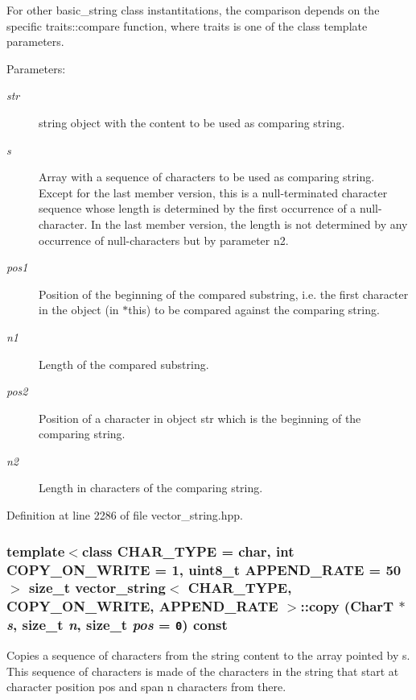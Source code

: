 For other basic\_\-string class instantitations, the comparison depends on the specific traits::compare function, where traits is one of the class template parameters.

\begin{Desc}
\item[Parameters:]
\begin{description}
\item[{\em str}]string object with the content to be used as comparing string. \item[{\em s}]Array with a sequence of characters to be used as comparing string. Except for the last member version, this is a null-terminated character sequence whose length is determined by the first occurrence of a null-character. In the last member version, the length is not determined by any occurrence of null-characters but by parameter n2. \item[{\em pos1}]Position of the beginning of the compared substring, i.e. the first character in the object (in $\ast$this) to be compared against the comparing string. \item[{\em n1}]Length of the compared substring. \item[{\em pos2}]Position of a character in object str which is the beginning of the comparing string. \item[{\em n2}]Length in characters of the comparing string. \end{description}
\end{Desc}


Definition at line 2286 of file vector\_\-string.hpp.\hypertarget{classvector__string_7583290c3d10030ebf722fcf5c5ca352}{
\subsubsection[{copy}]{\setlength{\rightskip}{0pt plus 5cm}template$<$class CHAR\_\-TYPE  = char, int COPY\_\-ON\_\-WRITE = 1, uint8\_\-t APPEND\_\-RATE = 50$>$ size\_\-t {\bf vector\_\-string}$<$ CHAR\_\-TYPE, COPY\_\-ON\_\-WRITE, APPEND\_\-RATE $>$::copy (CharT $\ast$ {\em s}, \/  size\_\-t {\em n}, \/  size\_\-t {\em pos} = {\tt 0}) const}}
\label{classvector__string_7583290c3d10030ebf722fcf5c5ca352}


Copies a sequence of characters from the string content to the array pointed by s. This sequence of characters is made of the characters in the string that start at character position pos and span n characters from there.

